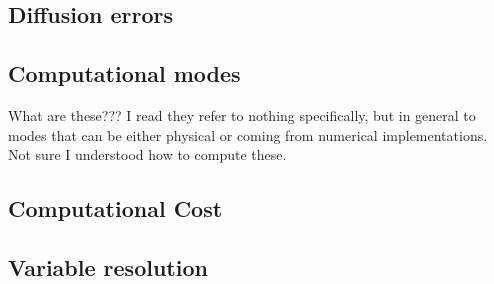 \subsection{Diffusion errors}

\subsection{Computational modes}
What are these??? I read they refer to nothing specifically, but in general to modes that can be either physical or coming from numerical implementations. Not sure I understood how to compute these.

\subsection{Computational Cost}

\subsection{Variable resolution}

